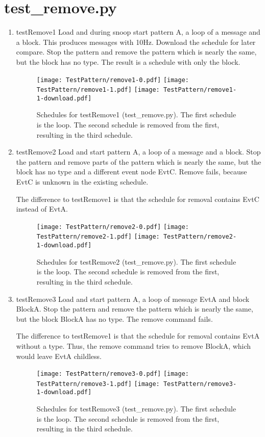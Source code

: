 \documentclass[12pt,a4paper]{report}
\begin{document}
\section{test\_remove.py}
\begin{enumerate}
\item testRemove1
    Load and during snoop start pattern A, a loop of a message and a
    block. This produces messages with 10Hz.
    Download the schedule for later compare.
    Stop the pattern and remove the pattern which is nearly the same, but
    the block has no type. The result is a schedule with only the block.
    \begin{figure}
        \centering
        \texttt{[image: TestPattern/remove1-0.pdf]}
        \texttt{[image: TestPattern/remove1-1.pdf]}
        \texttt{[image: TestPattern/remove1-1-download.pdf]}
        \caption{Schedules for testRemove1 (test\_remove.py). The first schedule
        is the loop. The second schedule is removed from the first,
        resulting in the third schedule.}
        \label{fig:Schedules_for_testRemove1}
    \end{figure}

\item testRemove2
    Load and start pattern A, a loop of a message and a block.
    Stop the pattern and remove parts of the pattern which is nearly the same, but
    the block has no type and a different event node EvtC. Remove fails,
    because EvtC is unknown in the existing schedule.

    The difference to testRemove1 is that the schedule for removal contains
    EvtC instead of EvtA.
    \begin{figure}
        \centering
        \texttt{[image: TestPattern/remove2-0.pdf]}
        \texttt{[image: TestPattern/remove2-1.pdf]}
        \texttt{[image: TestPattern/remove2-1-download.pdf]}
        \caption{Schedules for testRemove2 (test\_remove.py). The first schedule
        is the loop. The second schedule is removed from the first,
        resulting in the third schedule.}
        \label{fig:Schedules_for_testRemove2}
    \end{figure}

\item testRemove3
    Load and start pattern A, a loop of message EvtA and block BlockA.
    Stop the pattern and remove the pattern which is nearly the same, but
    the block BlockA has no type. The remove command fails.

    The difference to testRemove1 is that the schedule for removal contains
    EvtA without a type. Thus, the remove command tries to remove BlockA,
    which would leave EvtA childless.
    \begin{figure}
        \centering
        \texttt{[image: TestPattern/remove3-0.pdf]}
        \texttt{[image: TestPattern/remove3-1.pdf]}
        \texttt{[image: TestPattern/remove3-1-download.pdf]}
        \caption{Schedules for testRemove3 (test\_remove.py). The first schedule
        is the loop. The second schedule is removed from the first,
        resulting in the third schedule.}
        \label{fig:Schedules_for_testRemove3}
    \end{figure}


\end{enumerate}
\end{document}
